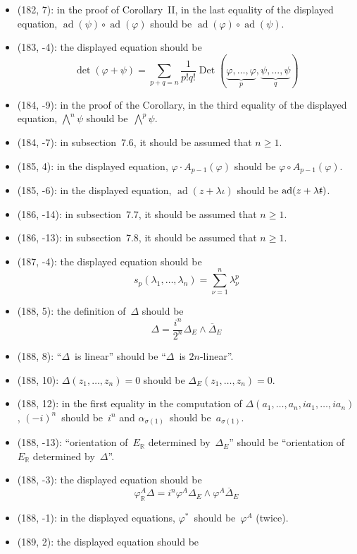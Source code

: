 \documentclass[letterpaper,12pt]{article}
\newcommand{\R}{\mathbb{R}}
\DeclareMathOperator{\ad}{ad}
\DeclareMathOperator{\Det}{Det}
\newcommand{\after}{\circ}
\newcommand{\mult}{\cdot}
\newcommand{\eprod}{\wedge}
\newcommand{\bigeprod}{\bigwedge}
\newcommand{\conj}[1]{\overline{#1}}
\newcommand{\stroked}[1]{\mathrlap{\text{\kern0.05em-}}#1}
\newcommand{\unit}{\stroked{t}}
\begin{document}
\begin{itemize}
\item (182, 7): in the proof of Corollary~II, in the last equality of the displayed equation, \(\ad(\psi)\after\ad(\varphi)\) should be \(\ad(\varphi)\after\ad(\psi)\).
\item (183, -4): the displayed equation should be
\[\det(\varphi+\psi)=\sum_{p+q=n}\frac{1}{p!q!}\Det(\underbrace{\varphi,\ldots,\varphi}_p,\underbrace{\psi,\ldots,\psi}_q)\]
\item (184, -9): in the proof of the Corollary, in the third equality of the displayed equation, \(\bigeprod^n\psi\) should be~\(\bigeprod^p\psi\).
\item (184, -7): in subsection~7.6, it should be assumed that \(n\ge 1\).
\item (185, 4): in the displayed equation, \(\varphi\mult A_{p-1}(\varphi)\) should be \(\varphi\after A_{p-1}(\varphi)\).
\item (185, -6): in the displayed equation, \(\ad(z+\lambda\iota)\) should be \(\ad(z+\lambda\unit)\).
\item (186, -14): in subsection~7.7, it should be assumed that \(n\ge 1\).
\item (186, -13): in subsection~7.8, it should be assumed that \(n\ge 1\).
\item (187, -4): the displayed equation should be
\[s_p(\lambda_1,\ldots,\lambda_n)=\sum_{\nu=1}^n\lambda_{\nu}^p\]
\item (188, 5): the definition of~\(\Delta\) should be
\[\Delta=\frac{i^n}{2^n}\Delta_E\eprod\conj{\Delta}_E\]
\item (188, 8): ``\(\Delta\)~is linear'' should be ``\(\Delta\)~is \(2n\)-linear''.
\item (188, 10): \(\Delta(z_1,\ldots,z_n)=0\) should be \(\Delta_E(z_1,\ldots,z_n)=0\).
\item (188, 12): in the first equality in the computation of \(\Delta(a_1,\ldots,a_n,ia_1,\ldots,ia_n)\), \((-i)^n\)~should be~\(i^n\) and \(\alpha_{\sigma(1)}\)~should be~\(a_{\sigma(1)}\).
\item (188, -13): ``orientation of~\(E_{\R}\) determined by~\(\Delta_E\)'' should be ``orientation of~\(E_{\R}\) determined by~\(\Delta\)''.
\item (188, -3): the displayed equation should be
\[\varphi_{\R}^A\Delta=i^n\varphi^A\Delta_E\eprod\varphi^A\conj{\Delta}_E\]
\item (188, -1): in the displayed equations, \(\varphi^*\)~should be~\(\varphi^A\) (twice).
\item (189, 2): the displayed equation should be

\end{itemize}
\end{document}

